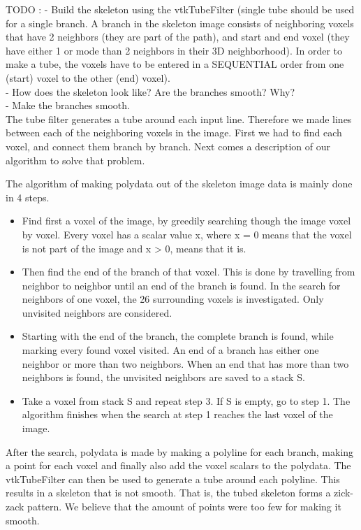 TODO : -	Build the skeleton using the vtkTubeFilter (single tube should be used for a single branch. A branch in the skeleton image consists of neighboring voxels that have 2 neighbors (they are part of the path), and start and end voxel (they have either 1 or mode than 2 neighbors in their 3D neighborhood). In order to make a tube, the voxels have to be entered in a SEQUENTIAL order from one (start) voxel to the other (end) voxel).\\
-	How does the skeleton look like? Are the branches smooth? Why?\\
-	Make the branches smooth.\\

The tube filter generates a tube around each input line. Therefore we made lines between each of the neighboring voxels in the image. First we had to find each voxel, and connect them branch by branch. Next comes a description of our algorithm to solve that problem.

The algorithm of making polydata out of the skeleton image data is mainly done in 4 steps.
\begin{itemize}

\item Find first a voxel of the image, by greedily searching though the image voxel by voxel. Every voxel has a scalar value x, where x = 0 means that the voxel is not part of the image and x > 0, means that it is. 

\item Then find the end of the branch of that voxel. This is done by travelling from neighbor to neighbor until an end of the branch is found. In the search for neighbors of one voxel, the 26 surrounding voxels is investigated. Only unvisited neighbors are considered.

\item Starting with the end of the branch, the complete branch is found, while marking every found voxel visited. An end of a branch has either one neighbor or more than two neighbors. When an end that has more than two neighbors is found, the unvisited neighbors are saved to a stack S.

\item Take a voxel from stack S and repeat step 3. If S is empty, go to step 1. The algorithm finishes when the search at step 1 reaches the last voxel of the image.

\end{itemize}

After the search, polydata is made by making a polyline for each branch, making a point for each voxel and finally also add the voxel scalars to the polydata. The vtkTubeFilter can then be used to generate a tube around each polyline. This results in a skeleton that is not smooth. That is, the tubed skeleton forms a zick-zack pattern. We believe that the amount of points were too few for making it smooth. \\

